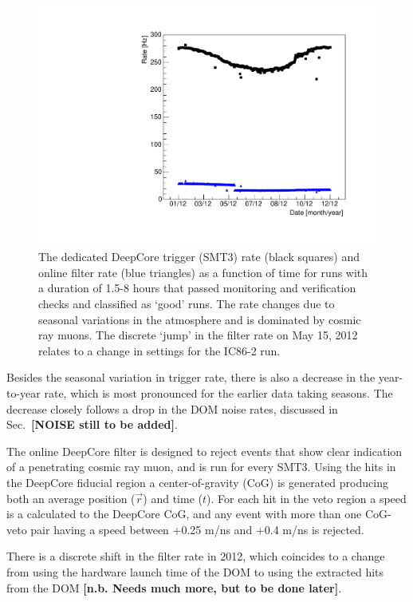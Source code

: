 \documentclass[../Main.tex]{subfiles}
\begin{document}
\begin{figure}
\centering
\includegraphics[scale=0.4]{DCTriggerFilterRate2012.pdf}
\caption{\label{fig:DCTriggerFilterRate} The dedicated DeepCore trigger (SMT3)
  rate (black squares) and online filter rate (blue triangles) as a function of time for runs with a
  duration of 1.5-8 hours that passed monitoring and
  verification checks and classified as `good' runs. The rate changes due to seasonal
  variations in the atmosphere and is dominated by cosmic ray
  muons. The discrete `jump' in the filter rate on May 15, 2012
  relates to a change in settings for the IC86-2 run.}
\end{figure}

Besides the seasonal variation in trigger rate, there is also a
decrease in the year-to-year rate, which is most pronounced for the
earlier data taking seasons. The decrease closely follows a drop
in the DOM noise rates, discussed in Sec.~\textbf{[NOISE still to be
  added]}. 

The online DeepCore filter is designed to reject events that show clear
indication of a penetrating cosmic ray muon, and is run for every
SMT3. Using the hits in the DeepCore fiducial region a
center-of-gravity (CoG) is generated producing both an average
position ($\vec{r}$) and time ($t$). For each hit in the veto region a
speed is a calculated to the DeepCore CoG, and any event with more
than one CoG-veto pair having a speed between +0.25 m/ns and +0.4 m/ns
is rejected.


There is a discrete shift in the filter rate in 2012,
which coincides to a change from using the hardware launch time of
the DOM to using the extracted hits from the DOM \textbf{[n.b. Needs much
more, but to be done later]}.
\end{document}
